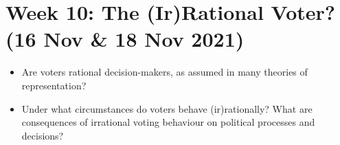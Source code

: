 \documentclass[abstract=on,parskip=full,headings=standardclasses,fontsize=11pt,paper=a4]{scrartcl}
\begin{document}

 
\section{Week 10: The (Ir)Rational Voter? (16 Nov \& 18 Nov 2021)}


\begin{itemize}
\renewcommand\labelitemi{--}
\item Are voters rational decision-makers, as assumed in many theories of representation? 
\item Under what circumstances do voters behave (ir)rationally? What are consequences of irrational voting behaviour on political processes and decisions?
\end{itemize}
\end{document}
